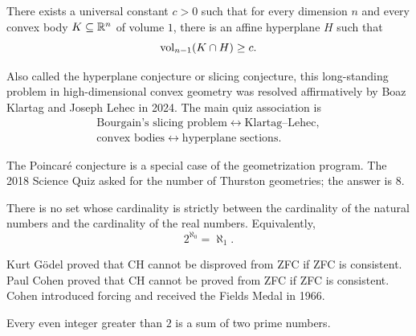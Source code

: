     \begin{theorem}
        There exists a universal constant $c>0$ such that for every dimension $n$
        and every convex body $K\subseteq\mathbb{R}^n$ of volume $1$, there is an
        affine hyperplane $H$ such that
        \[
            \operatorname{vol}_{n-1}(K\cap H)\geq c.
        \]
    \end{theorem}

    \begin{remark}
        Also called the hyperplane conjecture or slicing conjecture, this
        long-standing problem in high-dimensional convex geometry was resolved
        affirmatively by Boaz Klartag and Joseph Lehec in 2024. The main quiz
        association is
        \[
            \begin{gathered}
                \text{Bourgain's slicing problem}
                \longleftrightarrow \text{Klartag--Lehec},\\
                \text{convex bodies}
                \longleftrightarrow \text{hyperplane sections}.
            \end{gathered}
        \]
    \end{remark}

    \begin{remark}
        The Poincaré conjecture is a special case of the geometrization program.
        The 2018 Science Quiz asked for the number of Thurston geometries; the
        answer is $8$.
    \end{remark}

    \begin{hypothesis}
        There is no set whose cardinality is strictly between the cardinality of
        the natural numbers and the cardinality of the real numbers. Equivalently,
        \[
            2^{\aleph_0}=\aleph_1.
        \]
    \end{hypothesis}

    \begin{remark}
        Kurt Gödel proved that CH cannot be disproved from ZFC if ZFC is
        consistent. Paul Cohen proved that CH cannot be proved from ZFC if ZFC
        is consistent. Cohen introduced forcing and received the Fields Medal in
        1966.
    \end{remark}

    \begin{openproblem}
        Every even integer greater than $2$ is a sum of two prime numbers.
    \end{openproblem}

